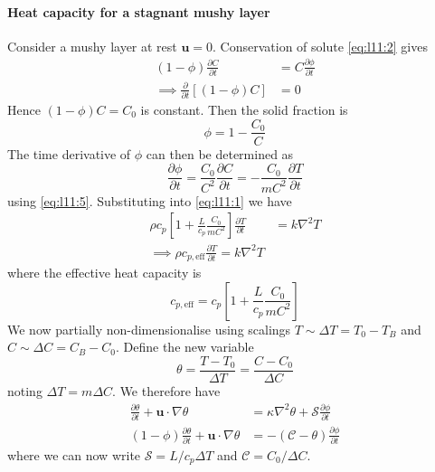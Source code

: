 \documentclass{jknotes}
\renewcommand{\u}{\symbf{u}}
\newcommand{\C}{\mathcal{C}}
\renewcommand{\S}{\mathcal{S}}
\begin{document}
\paragraph{Heat capacity for a stagnant mushy layer}
Consider a mushy layer at rest $\u = 0$. Conservation of solute
\eqref{eq:l11:2} gives
\begin{align}
	(1-\phi)\frac{\partial C}{\partial t} &= C\frac{\partial \phi}{\partial t}
	\\
	\implies \frac{\partial}{\partial t}\left[ (1-\phi)C\right] &= 0
\end{align}
Hence $(1-\phi)C = C_0$ is constant. Then the solid fraction is
\begin{equation}
	\phi = 1-\frac{C_0}{C}
\end{equation}
The time derivative of $\phi$ can then be determined as
\begin{equation}
	\frac{\partial \phi}{\partial t} = \frac{C_0}{C^2} \frac{\partial
	C}{\partial t} = -\frac{C_0}{mC^2}\frac{\partial T}{\partial t}
\end{equation}
using \eqref{eq:l11:5}. Substituting into \eqref{eq:l11:1} we have
\begin{align}
	\rho c_p \left[ 1 + \frac{L}{c_p}\frac{C_0}{mC^2}\right] \frac{\partial
	T}{\partial t} &= k\nabla^2 T \\
	\implies \rho c_{p,\text{eff}} \frac{\partial T}{\partial t} = k \nabla^2
	T
\end{align}
where the effective heat capacity is
\begin{equation}
	c_{p,\text{eff}} = c_p \left[ 1 + \frac{L}{c_p} \frac{C_0}{mC^2}\right]
\end{equation}
We now partially non-dimensionalise using scalings $T \sim \Delta T = T_0 -
T_B$ and $C \sim \Delta C = C_B -C_0$. Define the new variable
\begin{equation}
	\theta = \frac{T-T_0}{\Delta T} = \frac{C-C_0}{\Delta C}
\end{equation}
noting $\Delta T = m \Delta C$. We therefore have 
\begin{align}
	\frac{\partial \theta}{\partial t} + \u \cdot \nabla \theta &= \kappa
	\nabla^2 \theta + \S \frac{\partial \phi}{\partial t} \\
	(1-\phi)\frac{\partial \theta}{\partial t} + \u \cdot \nabla \theta &=
	-(\C-\theta)\frac{\partial \phi}{\partial t}
\end{align}
where we can now write $\S = L/c_p \Delta T$ and $\C = C_0/\Delta C$.
\end{document}
